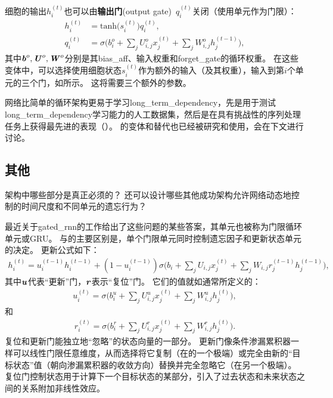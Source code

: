 细胞的输出$h_i^{(t)}$也可以由\textbf{输出门}(output gate)~$q_i^{(t)}$关闭（使用单元作为门限）：
\begin{align}
 h_i^{(t)} &= \text{tanh}\big( s_i^{(t)} \big) q_i^{(t)}, \\
 q_i^{(t)} &= \sigma \Big( b_i^o + \sum_j U_{i,j}^o x_j^{(t)} + \sum_j W_{i,j}^o h_j^{(t-1)} \Big),
\end{align}
其中$\boldsymbol{\mathit{b}}^o, \boldsymbol{\mathit{U}}^o, \boldsymbol{\mathit{W}}^o$分别是其\gls{bias_aff}、输入权重和\gls{forget_gate}的循环权重。
在这些变体中，可以选择使用细胞状态$s_i^{(t)}$作为额外的输入（及其权重），输入到第$i$个单元的三个门，如所示。
这将需要三个额外的参数。


网络比简单的循环架构更易于学习\gls{long_term_dependency}，先是用于测试\gls{long_term_dependency}学习能力的人工数据集\citep{Bengio-trnn94,Hochreiter+Schmidhuber-1997,chapter-gradient-flow-2001}，然后是在具有挑战性的序列处理任务上获得最先进的表现（\citep{Graves-book2012,Graves-arxiv2013,Sutskever-et-al-NIPS2014}）。
的变体和替代也已经被研究和使用，会在下文进行讨论。

\subsection{其他}
\label{sec:other_gated_rnns}
架构中哪些部分是真正必须的？
还可以设计哪些其他成功架构允许网络动态地控制的时间尺度和不同单元的遗忘行为？

最近关于\gls{gated_rnn}的工作给出了这些问题的某些答案，其单元也被称为门限循环单元或GRU\citep{cho-al-arxiv14-ssst8,Chung-et-al-NIPSDL2014-small,chung-icml15-gated,Jozefowicz-et-al-ICML2015,Chrupala-et-al-arxiv2015}。
与的主要区别是，单个门限单元同时控制遗忘因子和更新状态单元的决定。
更新公式如下：
\begin{align}
 h_i^{(t)} = u_i^{(t-1)} h_i^{(t-1)} + (1 - u_i^{(t-1)}) \sigma 
 \Big( b_i + \sum_j U_{i,j} x_j^{(t)} + \sum_j W_{i,j} r_j^{(t-1)} h_j^{(t-1)} \Big),
\end{align}
其中$\boldsymbol{\mathit{u}}$代表``更新''门，$\boldsymbol{\mathit{r}}$表示``复位''门。
它们的值就如通常所定义的：
\begin{align}
 u_i^{(t)} = \sigma \Big( b_i^u + \sum_j U_{i,j}^u x_j^{(t)} + \sum_j W_{i,j}^u h_j^{(t)} \Big),
\end{align}
和
\begin{align}
 r_i^{(t)} = \sigma \Big( b_i^r + \sum_j U_{i,j}^r x_j^{(t)} + \sum_j W_{i,j}^r h_j^{(t)} \Big).
\end{align}
复位和更新门能独立地``忽略''的状态向量的一部分。
更新门像条件渗漏累积器一样可以线性门限任意维度，从而选择将它复制（在的一个极端）或完全由新的``目标状态''值（朝向渗漏累积器的收敛方向）替换并完全忽略它（在另一个极端）。
复位门控制状态用于计算下一个目标状态的某部分，引入了过去状态和未来状态之间的关系附加非线性效应。

